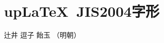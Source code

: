 \documentclass[uplatex]{jsarticle}
\begin{document}
\section{up\LaTeX~JIS2004字形}

辻井 逗子 飴玉 （明朝）

\end{document}
